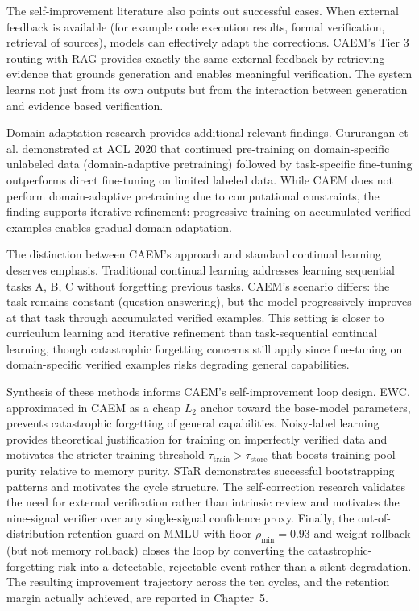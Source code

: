 The self-improvement literature also points out successful cases. When external feedback is available (for example code execution results, formal verification, retrieval of sources), models can effectively adapt the corrections. CAEM's Tier 3 routing with RAG provides exactly the same external feedback by retrieving evidence that grounds generation and enables meaningful verification. The system learns not just from its own outputs but from the interaction between generation and evidence based verification.

Domain adaptation research provides additional relevant findings. Gururangan et al. \cite{gururangan-etal-2020-dont} demonstrated at ACL 2020 that continued pre-training on domain-specific unlabeled data (domain-adaptive pretraining) followed by task-specific fine-tuning outperforms direct fine-tuning on limited labeled data. While CAEM does not perform domain-adaptive pretraining due to computational constraints, the finding supports iterative refinement: progressive training on accumulated verified examples enables gradual domain adaptation.

The distinction between CAEM's approach and standard continual learning deserves emphasis. Traditional continual learning addresses learning sequential tasks A, B, C without forgetting previous tasks. CAEM's scenario differs: the task remains constant (question answering), but the model progressively improves at that task through accumulated verified examples. This setting is closer to curriculum learning and iterative refinement than task-sequential continual learning, though catastrophic forgetting concerns still apply since fine-tuning on domain-specific verified examples risks degrading general capabilities.

Synthesis of these methods informs CAEM's self-improvement loop design. EWC, approximated in CAEM as a cheap $L_2$ anchor toward the base-model parameters, prevents catastrophic forgetting of general capabilities. Noisy-label learning provides theoretical justification for training on imperfectly verified data and motivates the stricter training threshold $\tau_{\text{train}} > \tau_{\text{store}}$ that boosts training-pool purity relative to memory purity. STaR demonstrates successful bootstrapping patterns and motivates the cycle structure. The self-correction research validates the need for external verification rather than intrinsic review and motivates the nine-signal verifier over any single-signal confidence proxy. Finally, the out-of-distribution retention guard on MMLU with floor $\rho_{\min} = 0.93$ and weight rollback (but not memory rollback) closes the loop by converting the catastrophic-forgetting risk into a detectable, rejectable event rather than a silent degradation. The resulting improvement trajectory across the ten cycles, and the retention margin actually achieved, are reported in Chapter~5.


